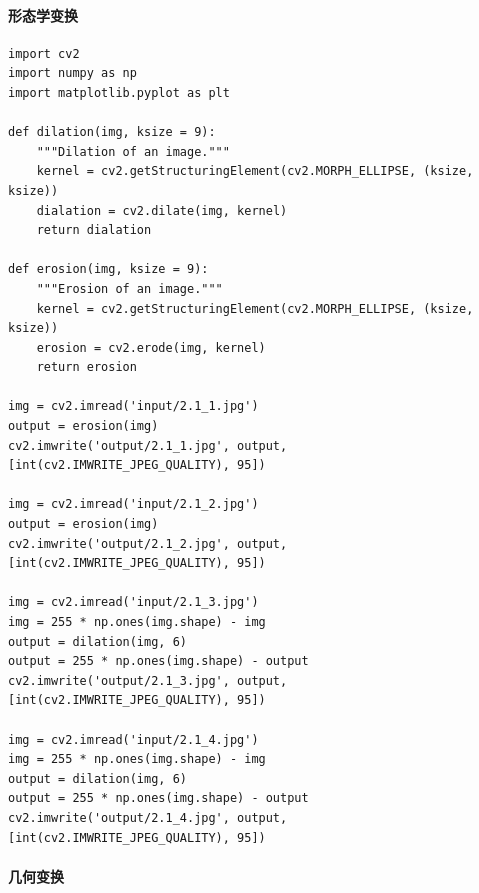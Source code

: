 \documentclass[11pt]{ctexart}
\begin{document}
\paragraph{形态学变换}

\lstset{language=python}
\begin{lstlisting}
import cv2
import numpy as np
import matplotlib.pyplot as plt

def dilation(img, ksize = 9):
	"""Dilation of an image."""
	kernel = cv2.getStructuringElement(cv2.MORPH_ELLIPSE, (ksize, ksize))
	dialation = cv2.dilate(img, kernel)
	return dialation

def erosion(img, ksize = 9):
	"""Erosion of an image."""
	kernel = cv2.getStructuringElement(cv2.MORPH_ELLIPSE, (ksize, ksize))
	erosion = cv2.erode(img, kernel)
	return erosion

img = cv2.imread('input/2.1_1.jpg')
output = erosion(img)
cv2.imwrite('output/2.1_1.jpg', output, [int(cv2.IMWRITE_JPEG_QUALITY), 95])

img = cv2.imread('input/2.1_2.jpg')
output = erosion(img)
cv2.imwrite('output/2.1_2.jpg', output, [int(cv2.IMWRITE_JPEG_QUALITY), 95])

img = cv2.imread('input/2.1_3.jpg')
img = 255 * np.ones(img.shape) - img
output = dilation(img, 6)
output = 255 * np.ones(img.shape) - output
cv2.imwrite('output/2.1_3.jpg', output, [int(cv2.IMWRITE_JPEG_QUALITY), 95])

img = cv2.imread('input/2.1_4.jpg')
img = 255 * np.ones(img.shape) - img
output = dilation(img, 6)
output = 255 * np.ones(img.shape) - output
cv2.imwrite('output/2.1_4.jpg', output, [int(cv2.IMWRITE_JPEG_QUALITY), 95])
\end{lstlisting}

\paragraph{几何变换}
\end{document}
